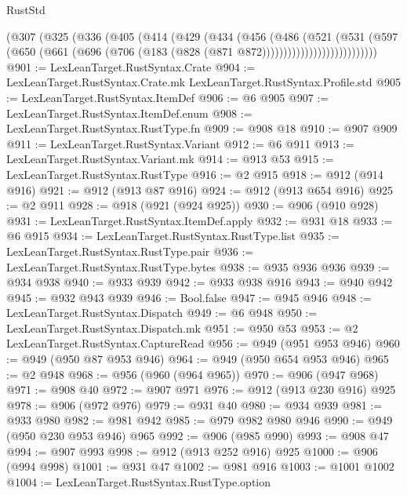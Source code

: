 \begin{lexlean}{RustStd}
\begin{coremodule}
                    (@307
                      (@325
                        (@336
                          (@405
                            (@414
                              (@429
                                (@434
                                  (@456
                                    (@486
                                      (@521
                                        (@531
                                          (@597
                                            (@650
                                              (@661
                                                (@696
                                                  (@706
                                                    (@183
                                                      (@828 (@871 @872)))))))))))))))))))))))))))
@901 := LexLeanTarget.RustSyntax.Crate
@904 := LexLeanTarget.RustSyntax.Crate.mk LexLeanTarget.RustSyntax.Profile.std
@905 := LexLeanTarget.RustSyntax.ItemDef
@906 := @6 @905
@907 := LexLeanTarget.RustSyntax.ItemDef.enum
@908 := LexLeanTarget.RustSyntax.RustType.fn
@909 := @908 @18
@910 := @907 @909
@911 := LexLeanTarget.RustSyntax.Variant
@912 := @6 @911
@913 := LexLeanTarget.RustSyntax.Variant.mk
@914 := @913 @53
@915 := LexLeanTarget.RustSyntax.RustType
@916 := @2 @915
@918 := @912 (@914 @916)
@921 := @912 (@913 @87 @916)
@924 := @912 (@913 @654 @916)
@925 := @2 @911
@928 := @918 (@921 (@924 @925))
@930 := @906 (@910 @928)
@931 := LexLeanTarget.RustSyntax.ItemDef.apply
@932 := @931 @18
@933 := @6 @915
@934 := LexLeanTarget.RustSyntax.RustType.list
@935 := LexLeanTarget.RustSyntax.RustType.pair
@936 := LexLeanTarget.RustSyntax.RustType.bytes
@938 := @935 @936 @936
@939 := @934 @938
@940 := @933 @939
@942 := @933 @938 @916
@943 := @940 @942
@945 := @932 @943 @939
@946 := Bool.false
@947 := @945 @946
@948 := LexLeanTarget.RustSyntax.Dispatch
@949 := @6 @948
@950 := LexLeanTarget.RustSyntax.Dispatch.mk
@951 := @950 @53
@953 := @2 LexLeanTarget.RustSyntax.CaptureRead
@956 := @949 (@951 @953 @946)
@960 := @949 (@950 @87 @953 @946)
@964 := @949 (@950 @654 @953 @946)
@965 := @2 @948
@968 := @956 (@960 (@964 @965))
@970 := @906 (@947 @968)
@971 := @908 @40
@972 := @907 @971
@976 := @912 (@913 @230 @916) @925
@978 := @906 (@972 @976)
@979 := @931 @40
@980 := @934 @939
@981 := @933 @980
@982 := @981 @942
@985 := @979 @982 @980 @946
@990 := @949 (@950 @230 @953 @946) @965
@992 := @906 (@985 @990)
@993 := @908 @47
@994 := @907 @993
@998 := @912 (@913 @252 @916) @925
@1000 := @906 (@994 @998)
@1001 := @931 @47
@1002 := @981 @916
@1003 := @1001 @1002
@1004 := LexLeanTarget.RustSyntax.RustType.option

\end{coremodule}
\end{lexlean}
